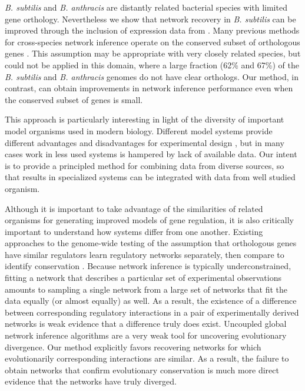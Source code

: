 \documentclass[11pt]{article}
\begin{document}
\textit{B. subtilis} and \textit{B. anthracis} are distantly related bacterial species with limited gene orthology. Nevertheless we show that network recovery in \textit{B. subtilis} can be improved through the inclusion of expression data from . Many previous methods for cross-species network inference operate on the conserved subset of orthologous genes \cite{dillman_comparative_2015}. This assumption may be appropriate with very closely related species, but could not be applied in this domain, where a large fraction (62\% and 67\%) of the \textit{B. subtilis} and \textit{B. anthracis} genomes do not have clear orthologs. Our method, in contrast, can obtain improvements in network inference performance even when the conserved subset of genes is small.

This approach is particularly interesting in light of the diversity of important model organisms used in modern biology. Different model systems provide different advantages and disadvantages for experimental design \cite{stolfi_genetic_2012}, but in many cases work in less used systems is hampered by lack of available data. Our intent is to provide a principled method for combining data from diverse sources, so that results in specialized systems can be integrated with data from well studied organism.

Although it is important to take advantage of the similarities of related organisms for generating improved models of gene regulation, it is also critically important to understand how systems differ from one another. Existing approaches to the genome-wide testing of the assumption that orthologous genes have similar regulators learn regulatory networks separately, then compare to identify conservation \cite{aytes_cross-species_2014}. 
Because network inference is typically underconstrained, fitting a network that describes a particular set of experimental observations amounts to sampling a single network from a large set of networks that fit the data equally (or almost equally) as well. As a result, the existence of a difference between corresponding regulatory interactions in a pair of experimentally derived networks is weak evidence that a difference truly does exist. 
Uncoupled global network inference algorithms are a very weak tool for uncovering evolutionary divergence. 
Our method explicitly favors recovering networks for which evolutionarily corresponding interactions are similar. 
As a result, the failure to obtain networks that confirm evolutionary conservation is much more direct evidence that the networks have truly diverged. 
\end{document}
